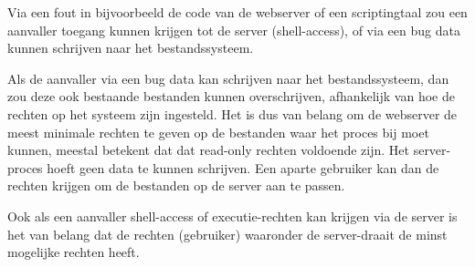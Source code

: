 Via een fout in bijvoorbeeld de code van de webserver of een scriptingtaal zou een aanvaller toegang kunnen krijgen tot de server (shell-access), of via een bug data kunnen schrijven naar het bestandssysteem.

Als de aanvaller via een bug data kan schrijven naar het bestandssysteem, dan zou deze ook bestaande bestanden kunnen overschrijven, afhankelijk van hoe de rechten op het systeem zijn ingesteld. Het is dus van belang om de webserver de meest minimale rechten te geven op de bestanden waar het proces bij moet kunnen, meestal betekent dat dat read-only rechten voldoende zijn. Het server-proces hoeft geen data te kunnen schrijven. Een aparte gebruiker kan dan de rechten krijgen om de bestanden op de server aan te passen.

Ook als een aanvaller shell-access of executie-rechten kan krijgen via de server is het van belang dat de rechten (gebruiker) waaronder de server-draait de minst mogelijke rechten heeft.
